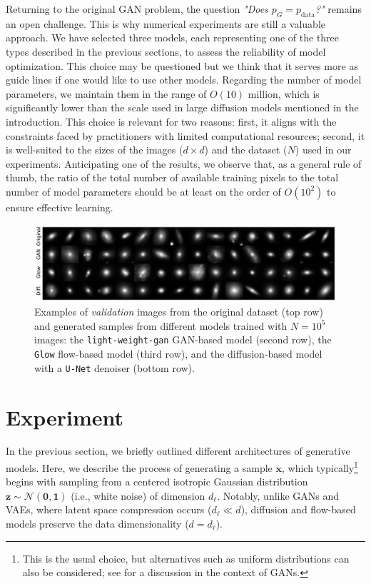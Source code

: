 \documentclass[fleqn,usenatbib]{mnras}
\begin{document}
{Returning to the original GAN problem, the question \textit{"Does $p_G = p_{\text{data}}$?"} remains an open challenge. This is why numerical experiments are still a valuable approach. We have selected three models, each representing one of the three types described in the previous sections, to assess the reliability of model optimization. This choice may be questioned but we think that it serves more as guide lines if one would like to use other models. 
Regarding the number of model parameters, we maintain them in the range of $O(10)$ million, which is significantly lower than the scale used in large diffusion models mentioned in the introduction. This choice is relevant for two reasons: first, it aligns with the constraints faced by practitioners with limited computational resources; second, it is well-suited to the sizes of the images ($d \times d$) and the dataset ($N$) used in our experiments.  
Anticipating one of the results, we observe that, as a general rule of thumb, the ratio of the total number of available training pixels to the total number of model parameters should be at least on the order of $O(10^2)$ to ensure effective learning.
}


%
\begin{figure}
    \centering
        \includegraphics[width=0.8\linewidth]{fig-model_sample_images.pdf}
    \caption{Examples of \textit{validation} images from the original dataset (top row) and generated samples from different models trained with $N = 10^5$ images: the \texttt{light-weight-gan} GAN-based model (second row), the \texttt{Glow} flow-based model (third row), and the diffusion-based model with a \texttt{U-Net} denoiser (bottom row).}
    \label{fig-Original-Glow-UNet-Gan-samples}
\end{figure}

%
\section{Experiment}
\label{sec-experiment}
%
In the previous section, we briefly outlined different architectures of generative models. Here, we describe the process of generating a sample $\bm{x}$, which typically\footnote{This is the usual choice, but alternatives such as uniform distributions can also be considered; see \cite{Brock2019} for a discussion in the context of GANs.} begins with sampling from a centered isotropic Gaussian distribution $\bm{z} \sim \mathcal{N}(\bm{0}, \bm{1})$ (i.e., white noise) of dimension $d_\ell$. {\color{red} Notably, unlike GANs and VAEs, where latent space compression occurs ($d_\ell \ll d$), diffusion and flow-based models preserve the data dimensionality ($d = d_\ell$).}
\end{document}
